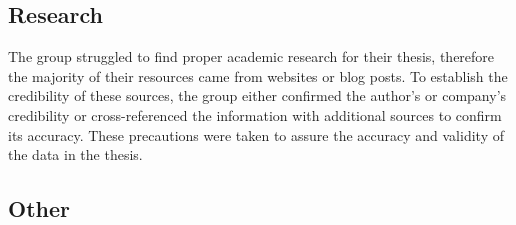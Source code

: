 \subsection{Research}
The group struggled to find proper academic research for their thesis, therefore the majority of their resources came from websites or blog posts. To establish the credibility of these sources, the group either confirmed the author's or company's credibility or cross-referenced the information with additional sources to confirm its accuracy. These precautions were taken to assure the accuracy and validity of the data in the thesis.  


\subsection{Other}

